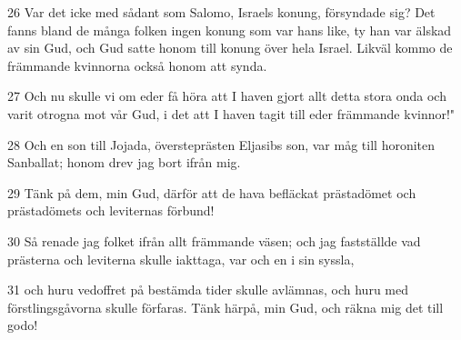 \par 26 Var det icke med sådant som Salomo, Israels konung, försyndade sig? Det fanns bland de många folken ingen konung som var hans like, ty han var älskad av sin Gud, och Gud satte honom till konung över hela Israel. Likväl kommo de främmande kvinnorna också honom att synda.
\par 27 Och nu skulle vi om eder få höra att I haven gjort allt detta stora onda och varit otrogna mot vår Gud, i det att I haven tagit till eder främmande kvinnor!"
\par 28 Och en son till Jojada, översteprästen Eljasibs son, var måg till horoniten Sanballat; honom drev jag bort ifrån mig.
\par 29 Tänk på dem, min Gud, därför att de hava befläckat prästadömet och prästadömets och leviternas förbund!
\par 30 Så renade jag folket ifrån allt främmande väsen; och jag fastställde vad prästerna och leviterna skulle iakttaga, var och en i sin syssla,
\par 31 och huru vedoffret på bestämda tider skulle avlämnas, och huru med förstlingsgåvorna skulle förfaras. Tänk härpå, min Gud, och räkna mig det till godo!


